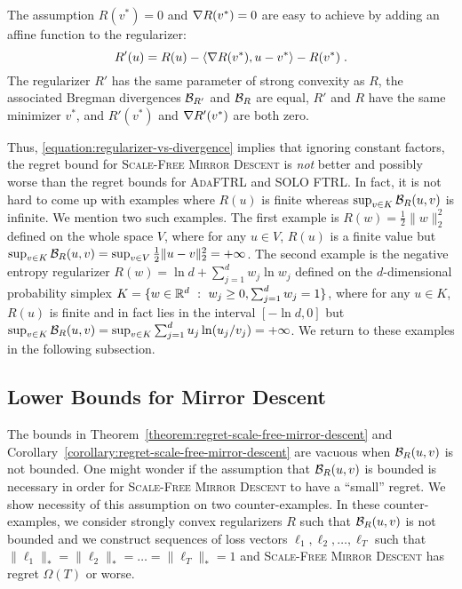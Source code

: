 The assumption $R(v^*) = 0$ and $\nabla R(v^*) = 0$
are easy to achieve by adding an affine function to the regularizer:
$$
R'(u) = R(u) - \langle \nabla R(v^*), u - v^* \rangle - R(v^*) \; .
$$
The regularizer $R'$ has the same parameter of strong convexity as $R$, the
associated Bregman divergences $\mathcal{B}_{R'}$ and $\mathcal{B}_{R}$ are equal, $R'$ and
$R$ have the same minimizer $v^*$, and $R'(v^*)$ and $\nabla R'(v^*)$ are both
zero.

Thus, \eqref{equation:regularizer-vs-divergence} implies that ignoring constant
factors, the regret bound for \textsc{Scale-Free Mirror Descent} is \emph{not}
better and possibly worse than the regret bounds for \textsc{AdaFTRL} and
\textsc{SOLO FTRL}.  In fact, it is not hard to come up with examples where
$R(u)$ is finite whereas $\sup_{v \in K} \mathcal{B}_R(u,v)$ is infinite. We mention
two such examples. The first example is $R(w) = \frac{1}{2}\|w\|_2^2$ defined
on the whole space $V$, where for any $u \in V$, $R(u)$ is a finite value but
$\sup_{v \in K} \mathcal{B}_R(u,v) = \sup_{v \in V} \frac{1}{2}\|u-v\|_2^2 =
+\infty$. The second example is the negative entropy regularizer $R(w) = \ln d
+ \sum_{j=1}^d w_j \ln w_j$ defined on the $d$-dimensional probability simplex
$K = \{ w \in \mathbb{R}^d ~:~ w_j \ge 0, \sum_{j=1}^d w_j = 1 \}$, where for any $u
\in K$, $R(u)$ is finite and in fact lies in the interval $[-\ln d, 0]$ but
$\sup_{v \in K} \mathcal{B}_R(u,v) = \sup_{v \in K} \sum_{j=1}^d u_j \ln(u_j/v_j) = +
\infty$. We return to these examples in the following subsection.

\subsection{Lower Bounds for Mirror Descent}
\label{subsection:mirror-descent-lower-bound}

The bounds in Theorem~\ref{theorem:regret-scale-free-mirror-descent} and
Corollary~\ref{corollary:regret-scale-free-mirror-descent} are vacuous when
$\mathcal{B}_R(u,v)$ is not bounded. One might wonder if the assumption that
$\mathcal{B}_R(u,v)$ is bounded is necessary in order for \textsc{Scale-Free Mirror
Descent} to have a ``small'' regret. We show necessity of this assumption on
two counter-examples.  In these counter-examples, we consider strongly convex
regularizers $R$ such that $\mathcal{B}_R(u,v)$ is not bounded and we construct
sequences of loss vectors $\ell_1, \ell_2, \dots, \ell_T$ such that
$\|\ell_1\|_* = \|\ell_2\|_* = \dots = \|\ell_T\|_* = 1$ and \textsc{Scale-Free
Mirror Descent} has regret $\Omega(T)$ or worse.

